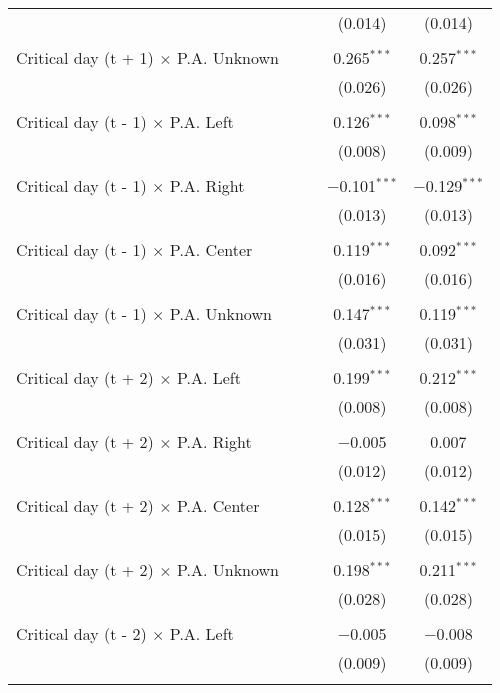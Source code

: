 \documentclass[
]{article}
\begin{document}
\begin{table}[!htbp]
{\begin{tabular}{@{\extracolsep{5pt}}lcccc}
  &  &  & (0.014) & (0.014) \\ 
  & & & & \\ 
 Critical day (t + 1) $\times$ P.A. Unknown &  &  & 0.265$^{***}$ & 0.257$^{***}$ \\ 
  &  &  & (0.026) & (0.026) \\ 
  & & & & \\ 
 Critical day (t - 1) $\times$ P.A. Left &  &  & 0.126$^{***}$ & 0.098$^{***}$ \\ 
  &  &  & (0.008) & (0.009) \\ 
  & & & & \\ 
 Critical day (t - 1) $\times$ P.A. Right &  &  & $-$0.101$^{***}$ & $-$0.129$^{***}$ \\ 
  &  &  & (0.013) & (0.013) \\ 
  & & & & \\ 
 Critical day (t - 1) $\times$ P.A. Center &  &  & 0.119$^{***}$ & 0.092$^{***}$ \\ 
  &  &  & (0.016) & (0.016) \\ 
  & & & & \\ 
 Critical day (t - 1) $\times$ P.A. Unknown &  &  & 0.147$^{***}$ & 0.119$^{***}$ \\ 
  &  &  & (0.031) & (0.031) \\ 
  & & & & \\ 
 Critical day (t + 2) $\times$ P.A. Left &  &  & 0.199$^{***}$ & 0.212$^{***}$ \\ 
  &  &  & (0.008) & (0.008) \\ 
  & & & & \\ 
 Critical day (t + 2) $\times$ P.A. Right &  &  & $-$0.005 & 0.007 \\ 
  &  &  & (0.012) & (0.012) \\ 
  & & & & \\ 
 Critical day (t + 2) $\times$ P.A. Center &  &  & 0.128$^{***}$ & 0.142$^{***}$ \\ 
  &  &  & (0.015) & (0.015) \\ 
  & & & & \\ 
 Critical day (t + 2) $\times$ P.A. Unknown &  &  & 0.198$^{***}$ & 0.211$^{***}$ \\ 
  &  &  & (0.028) & (0.028) \\ 
  & & & & \\ 
 Critical day (t - 2) $\times$ P.A. Left &  &  & $-$0.005 & $-$0.008 \\ 
  &  &  & (0.009) & (0.009) \\ 
  & & & & \\ 

\end{tabular}}
\end{table}
\end{document}
